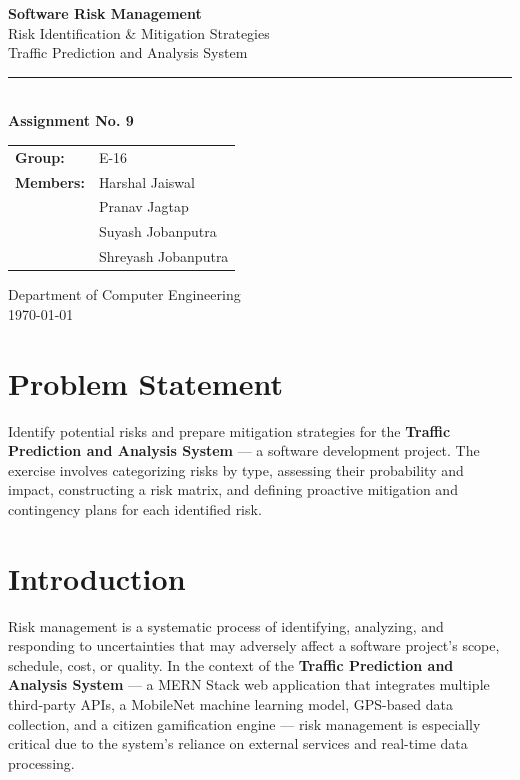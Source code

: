 \documentclass[12pt,a4paper]{article}
\begin{document}
\begin{titlepage}
\centering
\vspace*{2cm}
{\Huge\bfseries\color{headblue} Software Risk Management\\[12pt]}
{\LARGE Risk Identification \& Mitigation Strategies\\[8pt]}
{\large Traffic Prediction and Analysis System\\[20pt]}
\rule{0.6\textwidth}{1pt}\\[20pt]

{\large\textbf{Assignment No. 9}}\\[30pt]

\begin{tabular}{ll}
\textbf{Group:} & E-16 \\[4pt]
\textbf{Members:} & Harshal Jaiswal \\
 & Pranav Jagtap \\
 & Suyash Jobanputra \\
 & Shreyash Jobanputra \\
\end{tabular}

\vfill
{\small Department of Computer Engineering\\
\today}
\end{titlepage}

\section{Problem Statement}
Identify potential risks and prepare mitigation strategies for the \textbf{Traffic Prediction and Analysis System} --- a software development project. The exercise involves categorizing risks by type, assessing their probability and impact, constructing a risk matrix, and defining proactive mitigation and contingency plans for each identified risk.

\section{Introduction}
Risk management is a systematic process of identifying, analyzing, and responding to uncertainties that may adversely affect a software project's scope, schedule, cost, or quality. In the context of the \textbf{Traffic Prediction and Analysis System} --- a MERN Stack web application that integrates multiple third-party APIs, a MobileNet machine learning model, GPS-based data collection, and a citizen gamification engine --- risk management is especially critical due to the system's reliance on external services and real-time data processing.
\end{document}
